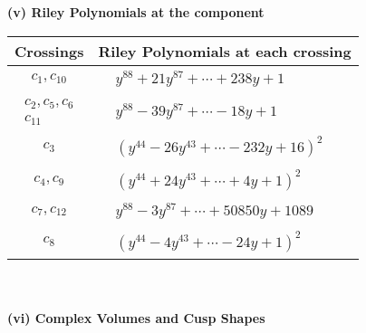 \documentclass[1p]{elsarticle_modified}
\theoremstyle{definition}
\begin{document}
\newpage\renewcommand{\arraystretch}{1}
\flushleft \textbf{(v) Riley Polynomials at the component}\newline \\
\begin{tabular}{m{50pt}|m{274pt}}
Crossings & \hspace{64pt}Riley Polynomials at each crossing \\
\hline $$\begin{aligned}c_{1},c_{10}\end{aligned}$$&$\begin{aligned}
&y^{88}+21 y^{87}+\cdots+238 y+1
\end{aligned}$\\
\hline $$\begin{aligned}c_{2},c_{5},c_{6}\\c_{11}\end{aligned}$$&$\begin{aligned}
&y^{88}-39 y^{87}+\cdots-18 y+1
\end{aligned}$\\
\hline $$\begin{aligned}c_{3}\end{aligned}$$&$\begin{aligned}
&(y^{44}-26 y^{43}+\cdots-232 y+16)^{2}
\end{aligned}$\\
\hline $$\begin{aligned}c_{4},c_{9}\end{aligned}$$&$\begin{aligned}
&(y^{44}+24 y^{43}+\cdots+4 y+1)^{2}
\end{aligned}$\\
\hline $$\begin{aligned}c_{7},c_{12}\end{aligned}$$&$\begin{aligned}
&y^{88}-3 y^{87}+\cdots+50850 y+1089
\end{aligned}$\\
\hline $$\begin{aligned}c_{8}\end{aligned}$$&$\begin{aligned}
&(y^{44}-4 y^{43}+\cdots-24 y+1)^{2}
\end{aligned}$\\
\hline
\end{tabular}\\~\\
\newpage\flushleft \textbf{(vi) Complex Volumes and Cusp Shapes}
\end{document}
